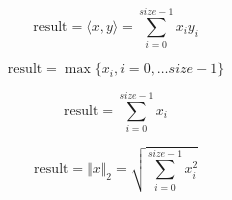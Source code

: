 \documentclass{article}
\begin{document}
\[\mathrm{result} = \langle x,y \rangle = \sum\limits_{i = 0}^{size-1} x_i y_i\]
\pagebreak

\[\mathrm{result} = \max \lbrace x_i, i = 0, \dots size-1 \rbrace\]
\pagebreak

\[\mathrm{result} = \sum\limits_{i = 0}^{size-1} x_i \]
\pagebreak

\[\mathrm{result} = \Vert x \Vert_2 = \sqrt{\sum\limits_{i = 0}^{size-1} x_i^2} \]
\pagebreak
\end{document}
